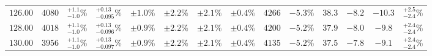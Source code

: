 \begin{landscape}
\begin{table}[ht!]
{\begin{tabular}{| cc | ccc | ccc | ccc | cc | c |}
$126.00$ & $4080$ & $^{+1.1}_{-1.0}\%$ & {\color{black!55}$^{+0.13}_{-0.095}\%$} & {\color{black!55}$\pm 1.0\%$} & $\pm 2.2\%$ & {\color{black!55}$\pm 2.1\%$} & {\color{black!55}$\pm 0.4\%$} & $4266$ & $-5.3\%$ & $38.3$ & $-8.2$ & $-10.3$ & $^{+2.5}_{-2.4}\%$ \\
$128.00$ & $4018$ & $^{+1.1}_{-1.0}\%$ & {\color{black!55}$^{+0.13}_{-0.096}\%$} & {\color{black!55}$\pm 0.9\%$} & $\pm 2.2\%$ & {\color{black!55}$\pm 2.1\%$} & {\color{black!55}$\pm 0.4\%$} & $4200$ & $-5.2\%$ & $37.9$ & $-8.0$ & $-9.8$ & $^{+2.4}_{-2.4}\%$ \\
$130.00$ & $3956$ & $^{+1.1}_{-1.0}\%$ & {\color{black!55}$^{+0.13}_{-0.097}\%$} & {\color{black!55}$\pm 0.9\%$} & $\pm 2.2\%$ & {\color{black!55}$\pm 2.1\%$} & {\color{black!55}$\pm 0.4\%$} & $4135$ & $-5.2\%$ & $37.5$ & $-7.8$ & $-9.1$ & $^{+2.4}_{-2.4}\%$ \\
\cline{1-14}
\end{tabular}
}
\end{table}


\end{landscape}
